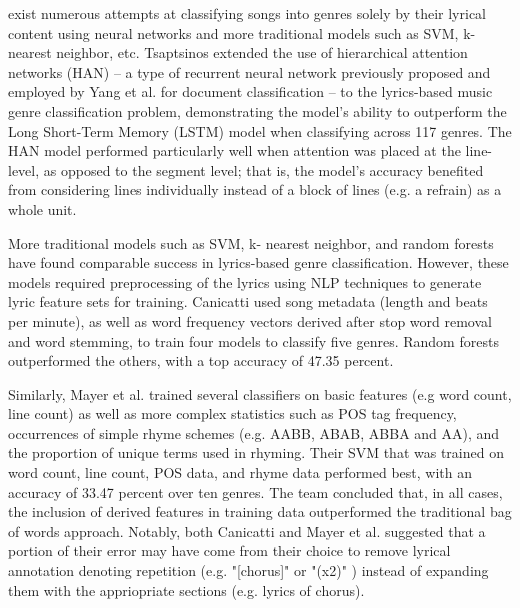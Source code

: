 \documentclass[journal]{IEEEtran}
\begin{document}
 exist numerous attempts at classifying songs into genres solely by their lyrical content using neural networks and more traditional models such as SVM, k-nearest neighbor, etc. 
Tsaptsinos \cite{tsaptsinos} extended the use of hierarchical attention networks (HAN) -- a type of recurrent neural network previously proposed and employed by Yang et al. \cite{Yang} for document classification -- to the lyrics-based music genre classification problem, demonstrating the model's ability to outperform the Long Short-Term Memory (LSTM) model when classifying across 117 genres. The HAN model performed particularly well when attention was placed at the line-level, as opposed to the segment level; that is, the model's accuracy benefited from considering lines individually instead of a block of lines (e.g. a refrain) as a whole unit. \par

More traditional models such as SVM, k- nearest neighbor, and random forests have found comparable success in lyrics-based genre classification. However, these models required preprocessing of the lyrics using NLP techniques to generate lyric feature sets for training. Canicatti \cite{canicatti} used song metadata (length and beats per minute), as well as word frequency vectors derived after stop word removal and word stemming, to train four models to classify five genres. Random forests outperformed the others, with a top accuracy of 47.35 percent. \par

Similarly, Mayer et al. \cite{mayer} trained several classifiers on basic features (e.g word count, line count) as well as more complex statistics such as POS tag frequency, occurrences of simple rhyme schemes (e.g. AABB, ABAB, ABBA and AA), and the proportion of unique terms used in rhyming. Their SVM that was trained on word count, line count, POS data, and rhyme data performed best, with an accuracy of 33.47 percent over ten genres. The team concluded that, in all cases, the inclusion of derived features in training data outperformed the traditional bag of words approach. Notably, both Canicatti and Mayer et al. suggested that a portion of their error may have come from their choice to remove lyrical annotation denoting repetition (e.g. "[chorus]" or "(x2)" ) instead of expanding them with the appriopriate sections (e.g. lyrics of chorus). \\ \\ \\ \\ \\  \par
\end{document}
